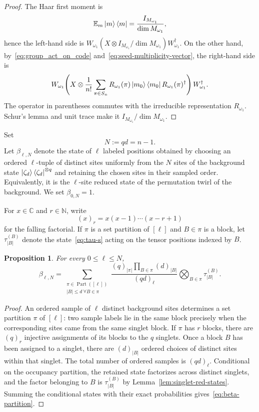 \documentclass[10pt,twocolumn,superscriptaddress,aps,amsmath,amssymb,citeautoscript,floatfix,prx]{revtex4-2}
\theoremstyle{plain}
\theoremstyle{plain}
\theoremstyle{plain}
\theoremstyle{plain}
\theoremstyle{plain}
\theoremstyle{plain}
\newcommand{\C}{\mathbb{C}}
\theoremstyle{plain}
\newtheorem{smproposition}[smtheorem]{Proposition}
\theoremstyle{definition}
\theoremstyle{plain}
\begin{document}
\begin{appendix}
\begin{proof}
The Haar first moment is
\[
  \mathbb{E}_m\ket m\bra m=\frac{I_{M_{\omega_1}}}{\dim M_{\omega_1}},
\]
hence the left-hand side is $W_{\omega_1}(X\otimes I_{M_{\omega_1}}/\dim M_{\omega_1})W_{\omega_1}^\dagger$.  
On the other hand, by~\eqref{eq:group_act_on_code} and~\eqref{eq:seed-multiplicity-vector}, the right-hand side is
\[
  W_{\omega_1}\!\left(
    X\otimes\frac1{n!}\sum_{\pi\in S_n}
    R_{\omega_1}(\pi)\ket{m_0}\bra{m_0}R_{\omega_1}(\pi)^\dagger
  \right)W_{\omega_1}^\dagger.
\]
The operator in parentheses commutes with the irreducible representation $R_{\omega_1}$.  
Schur's lemma and unit trace make it $I_{M_{\omega_1}}/\dim M_{\omega_1}$.
\end{proof}

Set
\[
  N:=qd=n-1.
\]
Let $\beta_{\ell,N}$ denote the state of $\ell$ labeled positions obtained by choosing an ordered $\ell$-tuple of distinct sites uniformly from the $N$ sites 
of the background state $\ket{\zeta_d}\bra{\zeta_d}^{\otimes q}$ and retaining the chosen sites in their sampled order.  
Equivalently, it is the $\ell$-site reduced state of the permutation twirl of the background. We set $\beta_{0,N}=1$.

For $x\in\C$ and $r\in\mathbb N$, write
\[
  (x)_r=x(x-1)\cdots(x-r+1)
\]
for the falling factorial. If $\pi$ is a set partition of $[\ell]$ and $B\in\pi$ is a block, let $\tau_{|B|}^{(B)}$ denote the state~\eqref{eq:tau-s} acting on the tensor positions indexed by $B$.

\begin{smproposition}
\label{prop:beta-partition}
For every $0\le\ell\le N$,
\begin{equation}
\label{eq:beta-partition}
  \beta_{\ell,N}
  =
  \sum_{\substack{\pi\in\operatorname{Part}([\ell])\\ |B|\le d\ \forall B\in\pi}}
  \frac{(q)_{|\pi|}\prod_{B\in\pi}(d)_{|B|}}
       {(qd)_\ell}
  \bigotimes_{B\in\pi}\tau_{|B|}^{(B)}.
\end{equation}
\end{smproposition}

\begin{proof}
An ordered sample of $\ell$ distinct background sites determines a set partition $\pi$ of $[\ell]$: two sample labels lie in the same block precisely when the corresponding 
sites came from the same singlet block. If $\pi$ has $r$ blocks, there are $(q)_r$ injective assignments of its blocks to the $q$ singlets. 
Once a block $B$ has been assigned to a singlet, there are $(d)_{|B|}$ ordered choices of distinct sites within that singlet.  
The total number of ordered samples is $(qd)_\ell$. Conditional on the occupancy partition, the retained state factorizes across distinct singlets, and the factor belonging to $B$ is $\tau_{|B|}^{(B)}$ by 
Lemma~\ref{lem:singlet-red-states}. Summing the conditional states with their exact probabilities gives~\eqref{eq:beta-partition}.
\end{proof}


\end{appendix}
\end{document}
